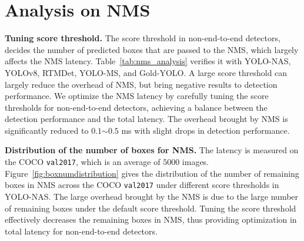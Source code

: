 \documentclass[runningheads]{llncs}
\begin{document}

\section{Analysis on NMS}
\noindent\textbf{Tuning score threshold.} The score threshold in non-end-to-end detectors, decides the number of predicted boxes that are passed to the NMS, which largely affects the NMS latency. Table~\ref{tab:nms_analysis} verifies it with YOLO-NAS, YOLOv8, RTMDet, YOLO-MS, and Gold-YOLO. A large score threshold can largely reduce the overhead of NMS, but bring negative results to detection performance. We optimize the NMS latency by carefully tuning the score thresholds for non-end-to-end detectors, achieving a balance between the detection performance and the total latency. The overhead brought by NMS is significantly reduced to $0.1$$\sim$$0.5$ ms with slight drops in detection performance.

\noindent\textbf{Distribution of the number of boxes for NMS.} The latency is measured on the COCO \texttt{val2017}, which is an average of $5000$ images. Figure~\ref{fig:boxnumdistribution} gives the distribution of the number of remaining boxes in NMS across the COCO \texttt{val2017} under different score thresholds in YOLO-NAS. The large overhead brought by the NMS is due to the large number of remaining boxes under the default score threshold. Tuning the score threshold effectively decreases the remaining boxes in NMS, thus providing optimization in total latency for non-end-to-end detectors.
\end{document}
